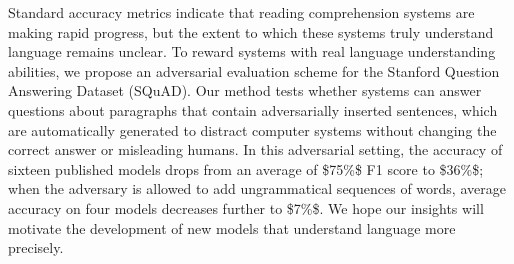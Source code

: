 Standard accuracy metrics indicate that reading comprehension systems are making rapid progress, but the extent to which these systems truly understand language remains unclear. To reward systems with real language understanding abilities, we propose an adversarial evaluation scheme for the Stanford Question Answering Dataset (SQuAD). Our method tests whether systems can answer questions about paragraphs that contain adversarially inserted sentences, which are automatically generated to distract computer systems without changing the correct answer or misleading humans. In this adversarial setting, the accuracy of sixteen published models drops from an average of \$75\%\$ F1 score to \$36\%\$; when the adversary is allowed to add ungrammatical sequences of words, average accuracy on four models decreases further to \$7\%\$. We hope our insights will motivate the development of new models that understand language more precisely.

